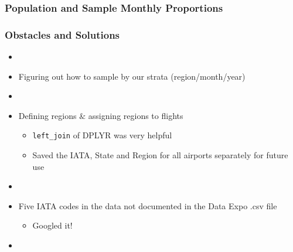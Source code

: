 \documentclass{beamer}
\begin{document}
\begin{frame}
\frametitle{Population and Sample Monthly Proportions}
\begin{center}
\end{center}
\end{frame}








\begin{frame}
\frametitle{Obstacles and Solutions}
\begin{itemize}

\item[]

\item Figuring out how to sample by our strata (region/month/year)

\item[]

\item Defining regions $\&$ assigning regions to flights
\begin{itemize}
\item \texttt{left\_join} of DPLYR was very helpful
\item Saved the IATA, State and Region for all airports separately for future use
\end{itemize}

\item[]

\item Five IATA codes in the data not documented in the Data Expo .csv file
\begin{itemize}
\item Googled it!
\end{itemize}

\item[]

\end{itemize}
\end{frame}
\end{document}
